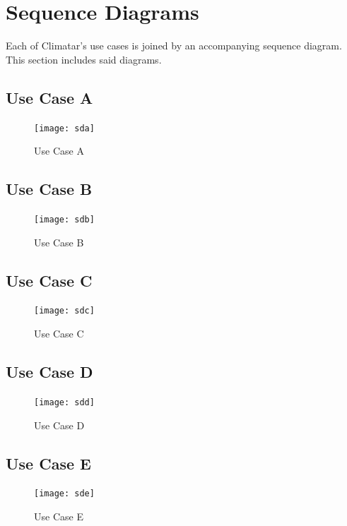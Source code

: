 \documentclass[]{article}
\begin{document}
\section{Sequence Diagrams}
\label{sec:sequence_diagrams}

Each of Climatar's use cases is joined by an accompanying sequence diagram. This section includes said diagrams.

\vspace{5mm}

\subsection{Use Case A}
\label{sub:overview}
\begin{figure}[H]
    \centering
    \texttt{[image: sda]}
    \caption{Use Case A}
    \label{fig:sda}
\end{figure}

\subsection{Use Case B}
\label{sub:overview}
\begin{figure}[H]
    \centering
    \texttt{[image: sdb]}
    \caption{Use Case B}
    \label{fig:sdb}
\end{figure}

\subsection{Use Case C}
\label{sub:overview}
\begin{figure}[H]
    \centering
    \texttt{[image: sdc]}
    \caption{Use Case C}
    \label{fig:sdc}
\end{figure}

\subsection{Use Case D}
\label{sub:overview}
\begin{figure}[H]
    \centering
    \texttt{[image: sdd]}
    \caption{Use Case D}
    \label{fig:sdd}
\end{figure}

\subsection{Use Case E}
\label{sub:overview}
\begin{figure}[H]
    \centering
    \texttt{[image: sde]}
    \caption{Use Case E}
    \label{fig:sde}
\end{figure}
\end{document}
